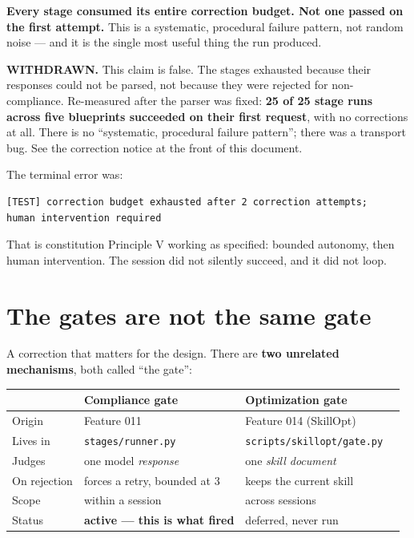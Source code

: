\documentclass[11pt,a4paper]{article}
\begin{document}
\textbf{Every stage consumed its entire correction budget. Not one passed on the
first attempt.} This is a systematic, procedural failure pattern, not random
noise --- and it is the single most useful thing the run produced.

\begin{notebox}[colframe=warn]
\textbf{WITHDRAWN.} This claim is false. The stages exhausted because their responses
could not be parsed, not because they were rejected for non-compliance. Re-measured
after the parser was fixed: \textbf{25 of 25 stage runs across five blueprints
succeeded on their first request}, with no corrections at all. There is no
``systematic, procedural failure pattern''; there was a transport bug. See the
correction notice at the front of this document.
\end{notebox}

The terminal error was:

\begin{lstlisting}
[TEST] correction budget exhausted after 2 correction attempts;
human intervention required
\end{lstlisting}

That is constitution Principle V working as specified: bounded autonomy, then
human intervention. The session did not silently succeed, and it did not loop.

\section{The gates are not the same gate}
\label{sec:gates}

A correction that matters for the design. There are \textbf{two unrelated
mechanisms}, both called ``the gate'':

\begin{center}
\begin{tabular}{@{}p{}p{}p{}p{}@{}}
\toprule
& \textbf{Compliance gate} & \textbf{Optimization gate} \\
\midrule
Origin & Feature 011 & Feature 014 (SkillOpt) \\
Lives in & \texttt{stages/runner.py} & \texttt{scripts/skillopt/gate.py} \\
Judges & one model \emph{response} & one \emph{skill document} \\
On rejection & forces a retry, bounded at 3 & keeps the current skill \\
Scope & within a session & across sessions \\
Status & \textbf{active --- this is what fired} & deferred, never run \\
\bottomrule
\end{tabular}
\end{center}
\end{document}
